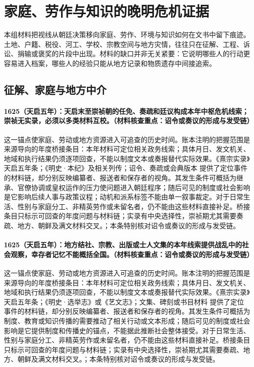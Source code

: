 \section{家庭、劳作与知识的晚明危机证据}

本组材料把视线从朝廷决策移向家庭、劳作、环境与知识如何在文书中留下痕迹。土地、户籍、税役、河工、学校、宗教空间与地方灾情，往往只在征解、工程、诉讼、捐输或褒奖的片段中出现。材料的缺口并非无关紧要：它说明哪些人的行动更容易进入档案，哪些人的经验只能从地方记录和物质遗存中间接追索。

\subsection{征解、家庭与地方中介}

\paragraph{1625（天启五年）：天启末至崇祯朝的任免、奏疏和廷议构成本年中枢危机线索；崇祯无实录，必须以多类材料互校。（材料核查重点：诏令或奏议的形成与发受链）} 这一锚点使家庭、劳动或地方资源进入可追查的历史时间。账本注明的把握范围是来源导向的年度桥接条目：本年材料可定位相关政务线索；具体月日、发文机关、地域和执行结果仍须逐项回查，不能以制度文本或奏报替代实际效果。《熹宗实录》天启五年条；《明史·本纪》及相关列传；诏令、奏疏或会典版本 提供了定位事件的材料链，却分别反映编纂者、报送者和保存者的视角。其发生条件可概括为继承、官僚协调或皇权运作的压力使问题进入朝廷程序；随后可见的制度或社会影响是它影响后续人事与政策议程；动机和派系标签不能由单一叙事裁定。对于日常生活、性别与家庭分工、非精英劳作或未留名者，仍不能由这些材料直接补足。桥接条目只标示可回查的年度问题与材料链；实录有中央选择性，崇祯期尤其需要奏疏、地方、朝鲜及满文材料交叉。；本条特别核对诏令或奏议的形成与发受链。

\paragraph{1625（天启五年）：地方结社、宗教、出版或士人文集的本年线索提供战乱中的社会观察，幸存者记忆不能概括全国。（材料核查重点：诏令或奏议的形成与发受链）} 这一锚点使家庭、劳动或地方资源进入可追查的历史时间。账本注明的把握范围是来源导向的年度桥接条目：本年材料可定位相关政务线索；具体月日、发文机关、地域和执行结果仍须逐项回查，不能以制度文本或奏报替代实际效果。《熹宗实录》天启五年条；《明史·选举志》或《艺文志》；文集、碑刻或书目材料 提供了定位事件的材料链，却分别反映编纂者、报送者和保存者的视角。其发生条件可概括为制度、教育或知识传播的需要推动了相关行动或文本形成；随后可见的制度或社会影响是它提供制度和传播史的锚点，不能据此推断社会整体接受。对于日常生活、性别与家庭分工、非精英劳作或未留名者，仍不能由这些材料直接补足。桥接条目只标示可回查的年度问题与材料链；实录有中央选择性，崇祯期尤其需要奏疏、地方、朝鲜及满文材料交叉。；本条特别核对诏令或奏议的形成与发受链。

